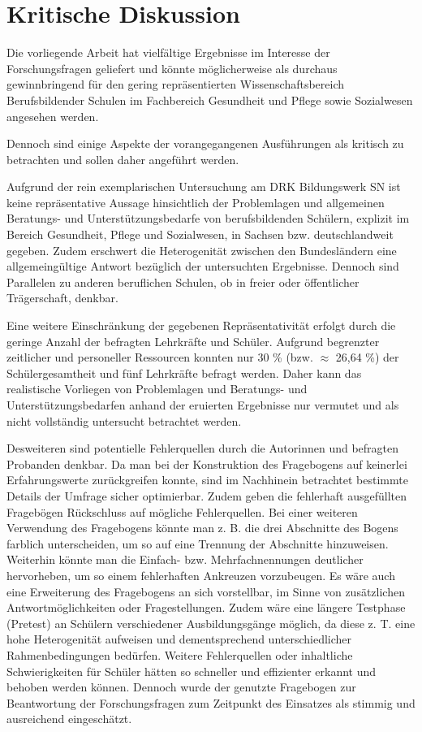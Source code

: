 \section{Kritische Diskussion}
\label{sec:KritischeDiskussion}

Die vorliegende Arbeit hat vielfältige Ergebnisse im Interesse der Forschungsfragen geliefert und könnte möglicherweise als durchaus gewinnbringend für den gering repräsentierten Wissenschaftsbereich Berufsbildender Schulen im Fachbereich Gesundheit und Pflege sowie Sozialwesen angesehen werden.

Dennoch sind einige Aspekte der vorangegangenen Ausführungen als kritisch zu betrachten und sollen daher angeführt werden.

Aufgrund der rein exemplarischen Untersuchung am DRK Bildungswerk SN ist keine repräsentative Aussage hinsichtlich der Problemlagen und allgemeinen Beratungs- und Unterstützungsbedarfe von berufsbildenden Schülern, explizit im Bereich Gesundheit, Pflege und Sozialwesen, in Sachsen bzw. deutschlandweit gegeben. Zudem erschwert die Heterogenität zwischen den Bundesländern eine allgemeingültige Antwort bezüglich der untersuchten Ergebnisse. Dennoch sind Parallelen zu anderen beruflichen Schulen, ob in freier oder öffentlicher Trägerschaft, denkbar.

Eine weitere Einschränkung der gegebenen Repräsentativität erfolgt durch die geringe Anzahl der befragten Lehrkräfte und Schüler. Aufgrund begrenzter zeitlicher und personeller Ressourcen konnten nur 30 \% (bzw. $\approx$ 26,64 \%) der Schülergesamtheit und fünf Lehrkräfte befragt werden. Daher kann das realistische Vorliegen von Problemlagen und Beratungs- und Unterstützungsbedarfen anhand der eruierten Ergebnisse nur vermutet und als nicht vollständig untersucht betrachtet werden. 

Desweiteren sind potentielle Fehlerquellen durch die Autorinnen und befragten Probanden denkbar. Da man bei der Konstruktion des Fragebogens auf keinerlei Erfahrungswerte zurückgreifen konnte, sind im Nachhinein betrachtet bestimmte Details der Umfrage sicher optimierbar. Zudem geben die fehlerhaft ausgefüllten Fragebögen Rückschluss auf mögliche Fehlerquellen. Bei einer weiteren Verwendung des Fragebogens könnte man z. B. die drei Abschnitte des Bogens farblich unterscheiden, um so auf eine Trennung der Abschnitte hinzuweisen. Weiterhin könnte man die Einfach- bzw. Mehrfachnennungen deutlicher hervorheben, um so einem fehlerhaften Ankreuzen vorzubeugen. Es wäre auch eine Erweiterung des Fragebogens an sich vorstellbar, im Sinne von zusätzlichen Antwortmöglichkeiten oder Fragestellungen. Zudem wäre eine längere Testphase (Pretest) an Schülern verschiedener Ausbildungsgänge möglich, da diese z. T. eine hohe Heterogenität aufweisen und dementsprechend unterschiedlicher Rahmenbedingungen bedürfen. Weitere Fehlerquellen oder inhaltliche Schwierigkeiten für Schüler hätten so schneller und effizienter erkannt und behoben werden können. Dennoch wurde der genutzte Fragebogen zur Beantwortung der Forschungsfragen zum Zeitpunkt des Einsatzes als stimmig und ausreichend eingeschätzt.

